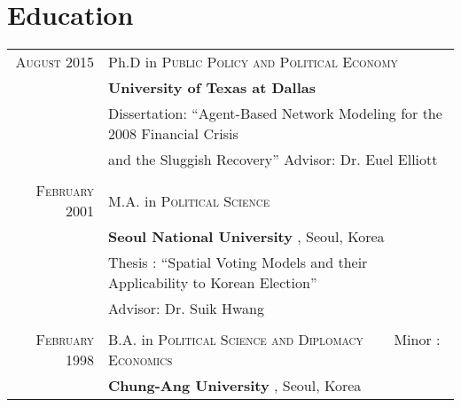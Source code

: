 \documentclass[a4paper,10pt]{article}
\begin{document}
\section{Education}
\begin{tabular}{rl}	

 \textsc{August}  2015 	
 & Ph.D in \textsc{Public Policy and Political Economy}\\
 & \textbf{University of Texas at Dallas}\\
& Dissertation: ``Agent-Based Network Modeling for the 2008 Financial Crisis\\
&  and the Sluggish Recovery'' \small Advisor: Dr. Euel Elliott  \normalsize \\

&\\
\vspace{-3pt}

\textsc{February} 2001
& M.A. in \textsc{Political Science}\\
&\textbf{Seoul National University }, Seoul, Korea\\
& Thesis :  ``Spatial Voting Models and their Applicability to Korean Election''\\
& \small Advisor: Dr. Suik Hwang \normalsize\\

&\\
\vspace{-3pt}

\textsc{February} 1998& B.A. in \textsc{Political Science and Diplomacy} ~~~ \small Minor : \textsc{Economics} \normalsize\\
&\textbf{Chung-Ang University }, Seoul, Korea\\
\end{tabular}

\vspace{10pt}




\end{document}
